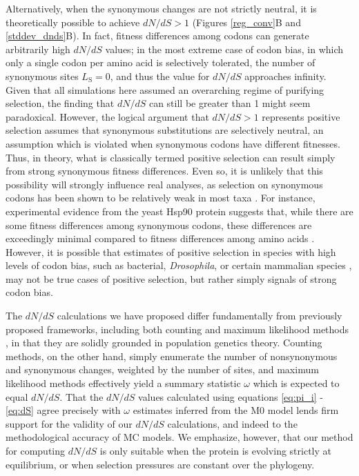\documentclass{pnastwo}
\begin{document}
\begin{article}
Alternatively, when the synonymous changes are not strictly neutral, it is theoretically possible to achieve $dN/dS > 1$ (Figures \ref{reg_conv}B and \ref{stddev_dnds}B). In fact, fitness differences among codons can generate arbitrarily high $dN/dS$ values; in the most extreme case of codon bias, in which only a single codon per amino acid is selectively tolerated, the number of synonymous sites $L_\text{S} = 0$, and thus the value for $dN/dS$ approaches infinity. Given that all simulations here assumed an overarching regime of purifying selection, the finding that $dN/dS$ can still be greater than 1 might seem paradoxical. However, the logical argument that $dN/dS > 1$ represents positive selection assumes that synonymous substitutions are selectively neutral, an assumption which is violated when synonymous codons have different fitnesses. Thus, in theory, what is classically termed positive selection can result simply from strong synonymous fitness differences. Even so, it is unlikely that this possibility will strongly influence real analyses, as selection on synonymous codons has been shown to be relatively weak in most taxa \cite{HershbergPetrov2008}. For instance, experimental evidence from the yeast Hsp90 protein suggests that, while there are some fitness differences among synonymous codons, these differences are exceedingly minimal compared to fitness differences among amino acids \cite{Hietpas2011,Hietpas2013}. However, it is possible that estimates of positive selection in species with high levels of codon bias, such as bacterial, \textit{Drosophila}, or certain mammalian species \cite{Duret2002, Chamaryetal2006, PlotkinKudla2010}, may not be true cases of positive selection, but rather simply signals of strong codon bias.

The $dN/dS$ calculations we have proposed differ fundamentally from previously proposed frameworks, including both counting \cite{LWL85,NG86,Pamilo1993,Ina1995,YN00} and maximum likelihood methods \cite{GoldmanYang1994,MuseGaut1994,Yang2006,Anisimova2009}, in that they are solidly grounded in population genetics theory. Counting methods, on the other hand, simply enumerate the number of nonsynonymous and synonymous changes, weighted by the number of sites, and maximum likelihood methods effectively yield a summary statistic $\omega$ which is expected to equal $dN/dS$. That the $dN/dS$ values calculated using equations \eqref{eq:pi_i} - \eqref{eq:dS} agree precisely with $\omega$ estimates inferred from the M0 model lends firm support for the validity of our $dN/dS$ calculations, and indeed to the methodological accuracy of MC models. We emphasize, however, that our method for computing $dN/dS$ is only suitable when the protein is evolving strictly at equilibrium, or when selection pressures are constant over the phylogeny.
 

\end{article}
\end{document}
